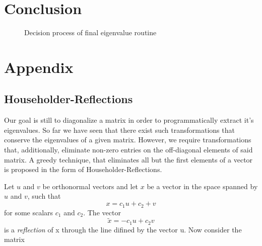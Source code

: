 \documentclass[12pt]{article}
\begin{document}
\section{Conclusion}
\begin{figure}
\centering
\caption{Decision process of final eigenvalue routine}
\end{figure}
\newpage
\section{Appendix}
\subsection{Householder-Reflections}

Our goal is still to diagonalize a matrix in order to programmatically extract it's eigenvalues. So far we have seen that there exist such transformations that conserve the eigenvalues of a given matrix. However, we require transformations that, additionally, eliminate non-zero entries on the off-diagonal elements of said matrix. A greedy technique, that eliminates all but the first elements of a vector is proposed in the form of Householder-Reflections.

Let $u$ and $v$ be orthonormal vectors and let $x$ be a vector in the space spanned by $u$ and $v$, such that
$$x = c_1 u + c_2 + v$$ 
for some scalars $c_1$ and $c_2$. The vector 
$$\tilde{x}=-c_1 u + c_2 v$$ 
is a \textit{reflection} of x through the line difined by the vector u. Now consider the matrix
\end{document}
